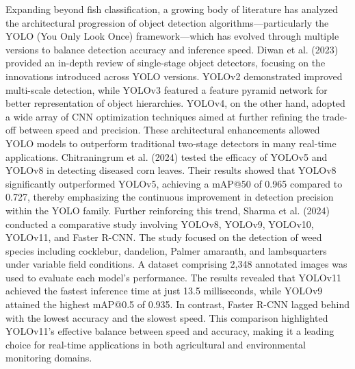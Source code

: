 Expanding beyond fish classification, a growing body of literature has analyzed the architectural progression of object detection algorithms—particularly the YOLO (You Only Look Once) framework—which has evolved through multiple versions to balance detection accuracy and inference speed. Diwan et al. (2023) provided an in-depth review of single-stage object detectors, focusing on the innovations introduced across YOLO versions. YOLOv2 demonstrated improved multi-scale detection, while YOLOv3 featured a feature pyramid network for better representation of object hierarchies. YOLOv4, on the other hand, adopted a wide array of CNN optimization techniques aimed at further refining the trade-off between speed and precision. These architectural enhancements allowed YOLO models to outperform traditional two-stage detectors in many real-time applications. Chitraningrum et al. (2024) tested the efficacy of YOLOv5 and YOLOv8 in detecting diseased corn leaves. Their results showed that YOLOv8 significantly outperformed YOLOv5, achieving a mAP@50 of 0.965 compared to 0.727, thereby emphasizing the continuous improvement in detection precision within the YOLO family. Further reinforcing this trend, Sharma et al. (2024) conducted a comparative study involving YOLOv8, YOLOv9, YOLOv10, YOLOv11, and Faster R-CNN. The study focused on the detection of weed species including cocklebur, dandelion, Palmer amaranth, and lambsquarters under variable field conditions. A dataset comprising 2,348 annotated images was used to evaluate each model’s performance. The results revealed that YOLOv11 achieved the fastest inference time at just 13.5 milliseconds, while YOLOv9 attained the highest mAP@0.5 of 0.935. In contrast, Faster R-CNN lagged behind with the lowest accuracy and the slowest speed. This comparison highlighted YOLOv11’s effective balance between speed and accuracy, making it a leading choice for real-time applications in both agricultural and environmental monitoring domains.

